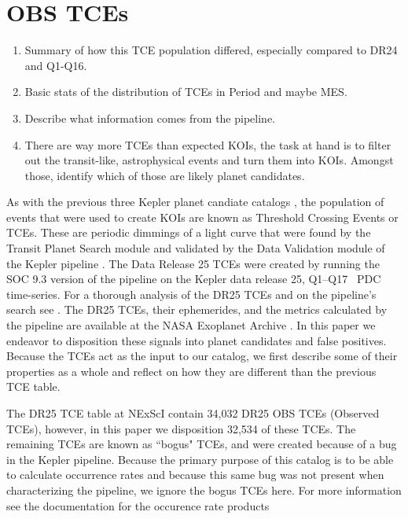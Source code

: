 \section{OBS TCEs}

\begin{enumerate}
\item Summary of how this TCE population differed, especially compared to DR24 and Q1-Q16.
\item Basic stats of the distribution of TCEs in Period and maybe MES.
\item Describe what information comes from the pipeline.
\item There are way more TCEs than expected KOIs, the task at hand is to filter out the transit-like, astrophysical events and turn them into KOIs. Amongst those, identify which of those are likely planet candidates.  

\end{enumerate}

\label{tces}
As with the previous three Kepler planet candiate catalogs \citep{Coughlin2016cat,Mullally2015cat,Rowe2015cat}, the population of events that were used to create KOIs are known as Threshold Crossing Events or TCEs.  These are periodic dimmings of a light curve that were found by the  Transit Planet Search module and validated by the Data Validation module of the Kepler pipeline \citep{Jenkins2017kdph, Fanelli2011}.   The Data Release 25 TCEs were created by running the SOC 9.3 version of the pipeline on the Kepler data release 25, Q1--Q17 \Kepler\ PDC time-series.  For a thorough analysis of the DR25 TCEs and on the pipeline's search see \citet{Twicken2016}.  The DR25 TCEs, their ephemerides, and the metrics calculated by the pipeline are available at the NASA Exoplanet Archive \citet{Aekeson2013}.  In this paper we endeavor to disposition these signals into planet candidates and false positives.   Because the TCEs act as the input to our catalog, we first describe some of their properties as a whole and reflect on how they are different than the previous TCE table.

The DR25 TCE table at NExScI contain 34,032 DR25 OBS TCEs (Observed TCEs), however, in this paper we disposition 32,534 of these TCEs. The remaining TCEs are known as ``bogus" TCEs, and were created because of a bug in the Kepler pipeline. Because the primary purpose of this catalog is to be able to calculate occurrence rates and because this same bug was not present when characterizing the pipeline, we ignore the bogus TCEs here. For more information see the documentation for the occurence rate products \citet{Burke2017} 

